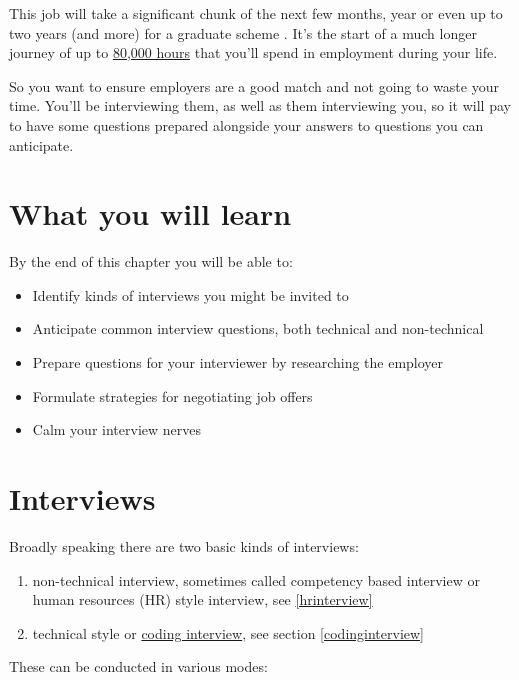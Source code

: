\documentclass[
]{book}
\providecommand{\tightlist}{%
  \setlength{\itemsep}{0pt}\setlength{\parskip}{0pt}}
\begin{document}
This job will take a significant chunk of the next few months, year or even up to two years (and more) for a graduate scheme \citep{jonathanblack}. It's the start of a much longer journey of up to \href{https://80000hours.org/}{80,000 hours} that you'll spend in employment during your life.

So you want to ensure employers are a good match and not going to waste your time. You'll be interviewing them, as well as them interviewing you, so it will pay to have some questions prepared alongside your answers to questions you can anticipate.

\hypertarget{ilo9}{%
\section{What you will learn}\label{ilo9}}

By the end of this chapter you will be able to:

\begin{itemize}
\tightlist
\item
  Identify kinds of interviews you might be invited to
\item
  Anticipate common interview questions, both technical and non-technical
\item
  Prepare questions for your interviewer by researching the employer
\item
  Formulate strategies for negotiating job offers
\item
  Calm your interview nerves
\end{itemize}

\hypertarget{interviews}{%
\section{Interviews}\label{interviews}}

Broadly speaking there are two basic kinds of interviews:

\begin{enumerate}
\def\labelenumi{\arabic{enumi}.}
\tightlist
\item
  non-technical interview, sometimes called competency based interview or human resources (HR) style interview, see \ref{hrinterview}
\item
  technical style or \href{https://en.wikipedia.org/wiki/Coding_interview}{coding interview}, see section \ref{codinginterview}
\end{enumerate}

These can be conducted in various modes:
\end{document}
